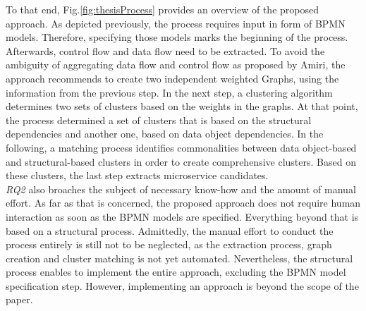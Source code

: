 \endgroup
\vspace{0.5cm}



\noindent
To that end, Fig.\ref{fig:thesisProcess} provides an overview of the proposed approach. As depicted previously, the process requires input in form of BPMN models. Therefore, specifying those models marks the beginning of the process. Afterwards, control flow and data flow need to be extracted. To avoid the ambiguity of aggregating data flow and control flow as proposed by Amiri, the approach recommends to create two independent weighted Graphs, using the information from the previous step. In the next step, a clustering algorithm determines two sets of clusters based on the weights in the graphs. At that point, the process determined a set of clusters that is based on the structural dependencies and another one, based on data object dependencies. In the following, a matching process identifies commonalities between data object-based and structural-based clusters in order to create comprehensive clusters. Based on these clusters, the last step extracts microservice candidates. \\
\textit{RQ2} also broaches the subject of necessary know-how and the amount of manual effort. As far as that is concerned, the proposed approach does not require human interaction as soon as the BPMN models are specified. Everything beyond that is based on a structural process.
Admittedly, the manual effort to conduct the process entirely is still not to be neglected, as the extraction process, graph creation and cluster matching is not yet automated. Nevertheless, the structural process enables to implement the entire approach, excluding the BPMN model specification step. However, implementing an approach is beyond the scope of the paper.




